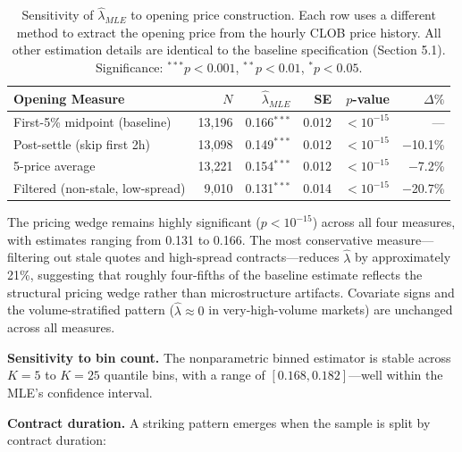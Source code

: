 \documentclass[12pt,a4paper]{article}
\begin{document}
\begin{table}[H]
\centering
\small
\caption{Sensitivity of $\hat{\lambda}_{MLE}$ to opening price construction. Each row uses a different method to extract the opening price from the hourly CLOB price history. All other estimation details are identical to the baseline specification (Section 5.1). Significance: $^{***}p<0.001$, $^{**}p<0.01$, $^{*}p<0.05$.}
\label{tab:opening_robustness}
\begin{tabular}{lrrrrr}
\toprule
Opening Measure & $N$ & $\hat{\lambda}_{MLE}$ & SE & $p$-value & $\Delta\%$ \\
\midrule
First-5\% midpoint (baseline) & 13,196 & 0.166$^{***}$ & 0.012 & $< 10^{-15}$ & --- \\
Post-settle (skip first 2h) & 13,098 & 0.149$^{***}$ & 0.012 & $< 10^{-15}$ & $-$10.1\% \\
5-price average & 13,221 & 0.154$^{***}$ & 0.012 & $< 10^{-15}$ & $-$7.2\% \\
Filtered (non-stale, low-spread) & 9,010 & 0.131$^{***}$ & 0.014 & $< 10^{-15}$ & $-$20.7\% \\
\bottomrule
\end{tabular}
\end{table}

The pricing wedge remains highly significant (\(p < 10^{-15}\)) across
all four measures, with estimates ranging from 0.131 to 0.166. The most
conservative measure---filtering out stale quotes and high-spread
contracts---reduces \(\hat{\lambda}\) by approximately 21\%, suggesting
that roughly four-fifths of the baseline estimate reflects the
structural pricing wedge rather than microstructure artifacts. Covariate
signs and the volume-stratified pattern (\(\hat{\lambda} \approx 0\) in
very-high-volume markets) are unchanged across all measures.

\textbf{Sensitivity to bin count.} The nonparametric binned estimator is
stable across \(K = 5\) to \(K = 25\) quantile bins, with a range of
\([0.168, 0.182]\)---well within the MLE's confidence interval.

\textbf{Contract duration.} A striking pattern emerges when the sample
is split by contract duration:
\end{document}
